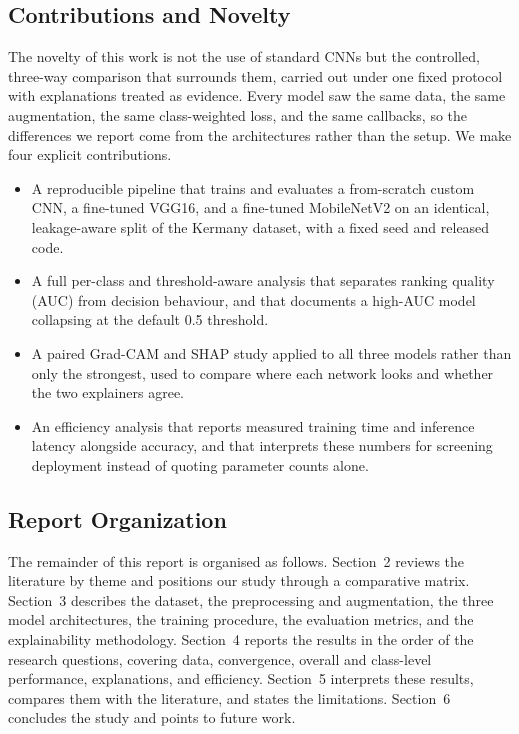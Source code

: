 \documentclass[preprint,12pt]{elsarticle}
\begin{document}
\subsection{Contributions and Novelty}
The novelty of this work is not the use of standard CNNs but the controlled, three-way comparison that surrounds them, carried out under one fixed protocol with explanations treated as evidence.
Every model saw the same data, the same augmentation, the same class-weighted loss, and the same callbacks, so the differences we report come from the architectures rather than the setup.
We make four explicit contributions.
\begin{itemize}
    \item A reproducible pipeline that trains and evaluates a from-scratch custom CNN, a fine-tuned VGG16, and a fine-tuned MobileNetV2 on an identical, leakage-aware split of the Kermany dataset, with a fixed seed and released code.
    \item A full per-class and threshold-aware analysis that separates ranking quality (AUC) from decision behaviour, and that documents a high-AUC model collapsing at the default 0.5 threshold.
    \item A paired Grad-CAM and SHAP study applied to all three models rather than only the strongest, used to compare where each network looks and whether the two explainers agree.
    \item An efficiency analysis that reports measured training time and inference latency alongside accuracy, and that interprets these numbers for screening deployment instead of quoting parameter counts alone.
\end{itemize}

\subsection{Report Organization}
The remainder of this report is organised as follows.
Section~2 reviews the literature by theme and positions our study through a comparative matrix.
Section~3 describes the dataset, the preprocessing and augmentation, the three model architectures, the training procedure, the evaluation metrics, and the explainability methodology.
Section~4 reports the results in the order of the research questions, covering data, convergence, overall and class-level performance, explanations, and efficiency.
Section~5 interprets these results, compares them with the literature, and states the limitations.
Section~6 concludes the study and points to future work.
\end{document}

